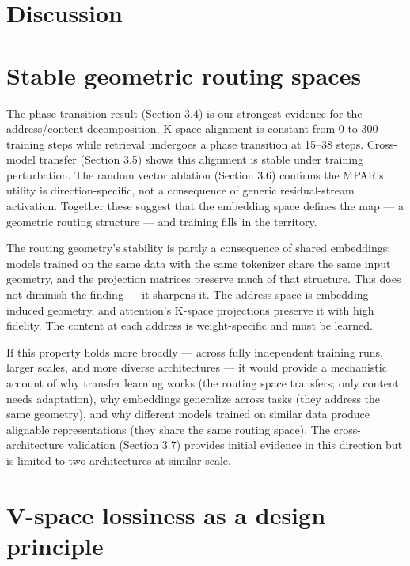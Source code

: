 \section{Discussion}\label{discussion}

\section{Stable geometric routing spaces}\label{stable-geometric-routing-spaces}

The phase transition result (Section 3.4) is our strongest evidence for the address/content decomposition. K-space alignment is constant from 0 to 300 training steps while retrieval undergoes a phase transition at 15--38 steps. Cross-model transfer (Section 3.5) shows this alignment is stable under training perturbation. The random vector ablation (Section 3.6) confirms the MPAR's utility is direction-specific, not a consequence of generic residual-stream activation. Together these suggest that the embedding space defines the map --- a geometric routing structure --- and training fills in the territory.

The routing geometry's stability is partly a consequence of shared embeddings: models trained on the same data with the same tokenizer share the same input geometry, and the projection matrices preserve much of that structure. This does not diminish the finding --- it sharpens it. The address space is embedding-induced geometry, and attention's K-space projections preserve it with high fidelity. The content at each address is weight-specific and must be learned.

If this property holds more broadly --- across fully independent training runs, larger scales, and more diverse architectures --- it would provide a mechanistic account of why transfer learning works (the routing space transfers; only content needs adaptation), why embeddings generalize across tasks (they address the same geometry), and why different models trained on similar data produce alignable representations (they share the same routing space). The cross-architecture validation (Section 3.7) provides initial evidence in this direction but is limited to two architectures at similar scale.

\section{V-space lossiness as a design principle}\label{v-space-lossiness-as-a-design-principle}

